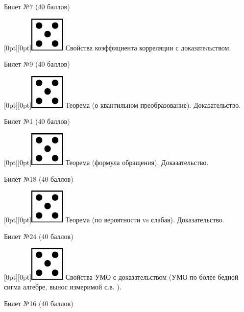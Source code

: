 \documentclass[10pt]{article}
\begin{document}
\begin{center} {\Large Билет №7 (40 баллов)} \end{center}

\raisebox{-1pt}[0pt][0pt]{\includegraphics[width=0.02\linewidth]{5.png}} Свойства коэффициента корреляции с доказательством. \\

\begin{center} {\Large Билет №9 (40 баллов)} \end{center}

\raisebox{-1pt}[0pt][0pt]{\includegraphics[width=0.02\linewidth]{5.png}}  Теорема (о квантильном преобразование). Доказательство. \\

\begin{center} {\Large Билет №1 (40 баллов)} \end{center}

\raisebox{-1pt}[0pt][0pt]{\includegraphics[width=0.02\linewidth]{5.png}} Теорема (формула обращения). Доказательство. \\

\begin{center} {\Large Билет №18 (40 баллов)} \end{center}

\raisebox{-1pt}[0pt][0pt]{\includegraphics[width=0.02\linewidth]{5.png}} Теорема (по вероятности vs слабая). Доказательство. \\  

\begin{center} {\Large Билет №24 (40 баллов)} \end{center}

\raisebox{-1pt}[0pt][0pt]{\includegraphics[width=0.02\linewidth]{5.png}} Свойства УМО с доказательством (УМО по более бедной сигма алгебре, вынос измеримой с.в. ). \\

\begin{center} {\Large Билет №16 (40 баллов)} \end{center}
\end{document}
